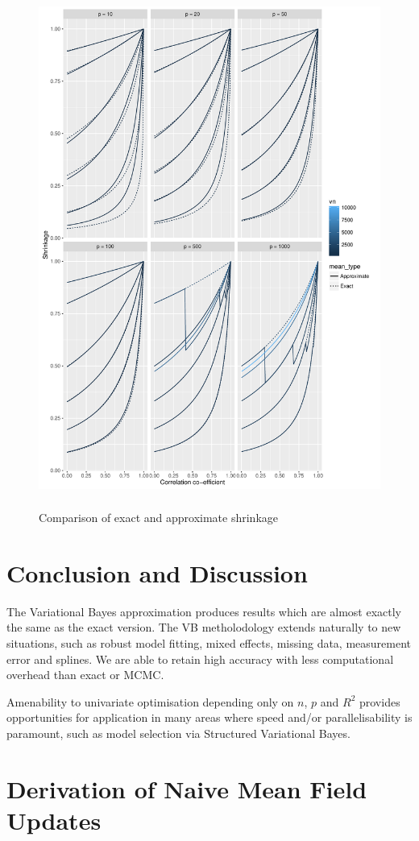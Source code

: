 \documentclass{amsart}[12pt]
\begin{document}
\begin{figure}
	\caption{Comparison of exact and approximate shrinkage}
	\label{fig:shrinkage}
	\includegraphics[width=17cm, height=17cm]{Chapter_3_shrinkage.pdf}
\end{figure}

\section{Conclusion and Discussion}
\label{sec:conclusion}

The Variational Bayes approximation produces results which are almost exactly the same as the exact version.
The VB metholodology extends naturally to new situations, such as robust model fitting, mixed effects, missing
data, measurement error and splines. We are able to retain high accuracy with less computational overhead than
exact or MCMC.

Amenability to univariate optimisation depending only on $n$, $p$ and $R^2$ provides opportunities for
application in many areas where speed and/or parallelisability is paramount, such as model selection via
Structured Variational Bayes.




\appendix
\section{Derivation of Naive Mean Field Updates}
\label{sec:appendix}
\end{document}
